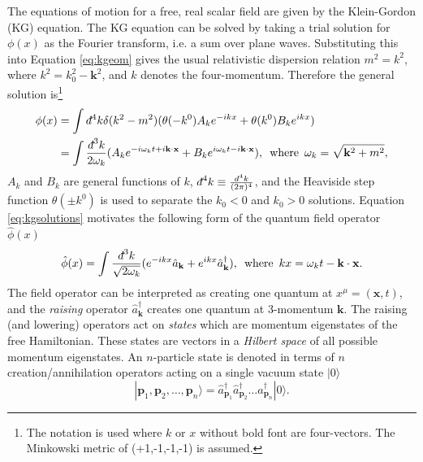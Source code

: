 The equations of motion for a free, real scalar field are given by the Klein-Gordon (KG) equation. The KG equation can be solved by taking a trial solution for $\phi(x)$ as the Fourier transform, i.e. a sum over plane waves. Substituting this into Equation \ref{eq:kgeom} gives the usual relativistic dispersion relation $m^2=k^2$, where $k^2=k_0^2-\mathbf{k}^2$, and $k$ denotes the four-momentum. Therefore the general solution is\footnote{The notation is used where $k$ or $x$ without bold font are four-vectors. The Minkowski metric of (+1,-1,-1,-1) is assumed.}
\begin{align}\label{eq:kgsolutions}
    \begin{split}
    \phi(x)&=\int\dbar{^4k}\delta(k^2-m^2)(\theta(-k^0)A_ke^{-ikx}+\theta(k^0)B_ke^{ikx})\\
    &=\int\frac{\dbar^3k}{2\omega_k}(A_ke^{-i\omega_kt+i\mathbf{k}\cdot\mathbf{x}}+B_ke^{i\omega_kt-i\mathbf{k}\cdot\mathbf{x}}),\hspace{5pt}\text{where}\hspace{5pt}\omega_k=\sqrt{\mathbf{k}^2+m^2},
    \end{split}
\end{align}
$A_k$ and $B_k$ are general functions of $k$, $\dbar^4k\equiv\frac{d^4k}{(2\pi)^4}$, and the Heaviside step function $\theta(\pm k^0)$ is used to separate the $k_0<0$ and $k_0>0$ solutions. Equation \ref{eq:kgsolutions} motivates the following form of the quantum field operator $\hat{\phi}(x)$
\begin{equation}
    \hat{\phi}(x)=\int\frac{\dbar^3k}{\sqrt{2\omega_k}}(e^{-ikx}\hat{a}{}_\mathbf{k}+e^{ikx}\hat{a}{}^\dagger_\mathbf{k}),\hspace{5pt}\text{where}\hspace{5pt}kx=\omega_kt-\mathbf{k}\cdot\mathbf{x}.
\end{equation}
The field operator can be interpreted as creating one quantum at $x^\mu=(\mathbf{x},t)$, and the \textit{raising} operator $\hat{a}{}^\dagger_\mathbf{k}$ creates one quantum at 3-momentum $\mathbf{k}$. The raising (and lowering) operators act on \textit{states} which are momentum eigenstates of the free Hamiltonian. These states are vectors in a \textit{Hilbert space} of all possible momentum eigenstates. An $n$-particle state is denoted in terms of $n$ creation/annihilation operators acting on a single vacuum state $|0\rangle$
\begin{equation}
    |\mathbf{p}_1,\mathbf{p}_2,\ldots,\mathbf{p}_n\rangle=\hat{a}{}^\dagger_{\mathbf{p}_1}\hat{a}{}^\dagger_{\mathbf{p}_2}\ldots\hat{a}{}^\dagger_{\mathbf{p}_n}|0\rangle.
\end{equation}
